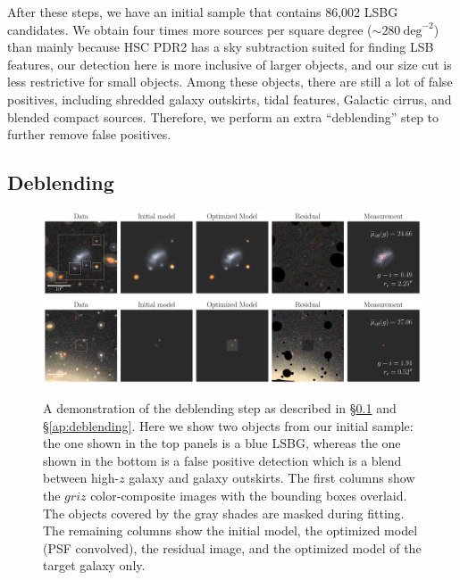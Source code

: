 \documentclass[twocolumn,astrosymb,twocolappendix]{aastex631}
\begin{document}
\begin{CJK*}{UTF8}{gbsn}
After these steps, we have an initial sample that contains 86,002 LSBG candidates. We obtain four times more sources per square degree ($\sim 280\ \mathrm{deg}^{-2}$) than  mainly because HSC PDR2 has a sky subtraction suited for finding LSB features, our detection here is more inclusive of larger objects, and our size cut is less restrictive for small objects. Among these objects, there are still a lot of false positives, including shredded galaxy outskirts, tidal features, Galactic cirrus, and blended compact sources. Therefore, we perform an extra ``deblending'' step to further remove false positives.  


\subsection{Deblending}\label{sec:deblending}

\begin{figure}
	\vbox{ 
		\centering
		\includegraphics[width=1\linewidth]{vanilla_scarlet_demo.pdf}
		\includegraphics[width=1\linewidth]{vanilla_scarlet_demo2.pdf}
	}
	\caption{A demonstration of the deblending step as described in \S\ref{sec:deblending} and \S\ref{ap:deblending}. Here we show two objects from our initial sample: the one shown in the top panels is a blue LSBG, whereas the one shown in the bottom is a false positive detection which is a blend between high-$z$ galaxy and galaxy outskirts. The first columns show the $griz$ color-composite images with the bounding boxes overlaid. The objects covered by the gray shades are masked during fitting. The remaining columns show the initial model, the optimized model (PSF convolved), the residual image, and the optimized model of the target galaxy only. 
	}
	\label{fig:vanilla_scarlet_demo}
\end{figure}


\end{CJK*}
\end{document}
